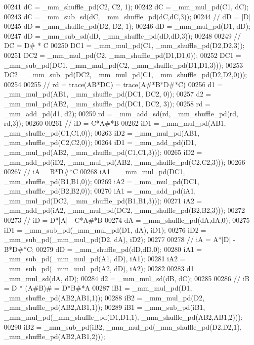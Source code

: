 \begin{DoxyCode}
00241     dC = \_mm\_shuffle\_pd(C2, C2, 1);
00242     dC = \_mm\_mul\_pd(C1, dC);
00243     dC = \_mm\_sub\_sd(dC, \_mm\_shuffle\_pd(dC,dC,3));
00244     \textcolor{comment}{//  dD = |D|}
00245     dD = \_mm\_shuffle\_pd(D2, D2, 1);
00246     dD = \_mm\_mul\_pd(D1, dD);
00247     dD = \_mm\_sub\_sd(dD, \_mm\_shuffle\_pd(dD,dD,3));
00248 
00249     \textcolor{comment}{//  DC = D# * C}
00250     DC1 = \_mm\_mul\_pd(C1, \_mm\_shuffle\_pd(D2,D2,3));
00251     DC2 = \_mm\_mul\_pd(C2, \_mm\_shuffle\_pd(D1,D1,0));
00252     DC1 = \_mm\_sub\_pd(DC1, \_mm\_mul\_pd(C2, \_mm\_shuffle\_pd(D1,D1,3)));
00253     DC2 = \_mm\_sub\_pd(DC2, \_mm\_mul\_pd(C1, \_mm\_shuffle\_pd(D2,D2,0)));
00254 
00255     \textcolor{comment}{//  rd = trace(AB*DC) = trace(A#*B*D#*C)}
00256     d1 = \_mm\_mul\_pd(AB1, \_mm\_shuffle\_pd(DC1, DC2, 0));
00257     d2 = \_mm\_mul\_pd(AB2, \_mm\_shuffle\_pd(DC1, DC2, 3));
00258     rd = \_mm\_add\_pd(d1, d2);
00259     rd = \_mm\_add\_sd(rd, \_mm\_shuffle\_pd(rd, rd,3));
00260 
00261     \textcolor{comment}{//  iD = C*A#*B}
00262     iD1 = \_mm\_mul\_pd(AB1, \_mm\_shuffle\_pd(C1,C1,0));
00263     iD2 = \_mm\_mul\_pd(AB1, \_mm\_shuffle\_pd(C2,C2,0));
00264     iD1 = \_mm\_add\_pd(iD1, \_mm\_mul\_pd(AB2, \_mm\_shuffle\_pd(C1,C1,3)));
00265     iD2 = \_mm\_add\_pd(iD2, \_mm\_mul\_pd(AB2, \_mm\_shuffle\_pd(C2,C2,3)));
00266 
00267     \textcolor{comment}{//  iA = B*D#*C}
00268     iA1 = \_mm\_mul\_pd(DC1, \_mm\_shuffle\_pd(B1,B1,0));
00269     iA2 = \_mm\_mul\_pd(DC1, \_mm\_shuffle\_pd(B2,B2,0));
00270     iA1 = \_mm\_add\_pd(iA1, \_mm\_mul\_pd(DC2, \_mm\_shuffle\_pd(B1,B1,3)));
00271     iA2 = \_mm\_add\_pd(iA2, \_mm\_mul\_pd(DC2, \_mm\_shuffle\_pd(B2,B2,3)));
00272 
00273     \textcolor{comment}{//  iD = D*|A| - C*A#*B}
00274     dA = \_mm\_shuffle\_pd(dA,dA,0);
00275     iD1 = \_mm\_sub\_pd(\_mm\_mul\_pd(D1, dA), iD1);
00276     iD2 = \_mm\_sub\_pd(\_mm\_mul\_pd(D2, dA), iD2);
00277 
00278     \textcolor{comment}{//  iA = A*|D| - B*D#*C;}
00279     dD = \_mm\_shuffle\_pd(dD,dD,0);
00280     iA1 = \_mm\_sub\_pd(\_mm\_mul\_pd(A1, dD), iA1);
00281     iA2 = \_mm\_sub\_pd(\_mm\_mul\_pd(A2, dD), iA2);
00282 
00283     d1 = \_mm\_mul\_sd(dA, dD);
00284     d2 = \_mm\_mul\_sd(dB, dC);
00285 
00286     \textcolor{comment}{//  iB = D * (A#B)# = D*B#*A}
00287     iB1 = \_mm\_mul\_pd(D1, \_mm\_shuffle\_pd(AB2,AB1,1));
00288     iB2 = \_mm\_mul\_pd(D2, \_mm\_shuffle\_pd(AB2,AB1,1));
00289     iB1 = \_mm\_sub\_pd(iB1, \_mm\_mul\_pd(\_mm\_shuffle\_pd(D1,D1,1), \_mm\_shuffle\_pd(AB2,AB1,2)));
00290     iB2 = \_mm\_sub\_pd(iB2, \_mm\_mul\_pd(\_mm\_shuffle\_pd(D2,D2,1), \_mm\_shuffle\_pd(AB2,AB1,2)));

\end{DoxyCode}
